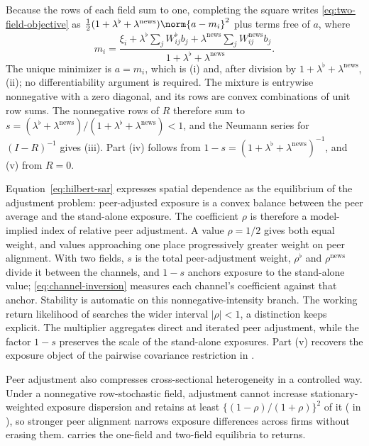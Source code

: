 Because the rows of each field sum to one, completing the square writes
\eqref{eq:two-field-objective} as
$\tfrac12(1+\lambda^\flat+\lambda^{\mathrm{news}})\norm{a-m_i}^2$ plus terms
free of $a$, where
\[
  m_i=\frac{\xi_i+\lambda^\flat\sum_j W^\flat_{ij}b_j
    +\lambda^{\mathrm{news}}\sum_j
  W^{\mathrm{news}}_{ij}b_j}{1+\lambda^\flat+\lambda^{\mathrm{news}}}.
\]
The unique minimizer is $a=m_i$, which is (i) and, after division by
$1+\lambda^\flat+\lambda^{\mathrm{news}}$, (ii); no differentiability
argument is required.
The mixture is entrywise nonnegative with a zero diagonal, and its rows are
convex combinations of unit row sums.
The nonnegative rows of $R$ therefore sum to $s=(\lambda^\flat+\lambda^{\mathrm{news}})/
(1+\lambda^\flat+\lambda^{\mathrm{news}})<1$, and the Neumann series for
$(I-R)^{-1}$ gives (iii).
Part (iv) follows from $1-s=(1+\lambda^\flat+\lambda^{\mathrm{news}})^{-1}$,
and (v) from $R=0$.

Equation~\eqref{eq:hilbert-sar} expresses spatial dependence as the equilibrium
of the adjustment problem: peer-adjusted exposure is a convex balance between
the peer average and the stand-alone exposure.
The coefficient $\rho$ is therefore a model-implied index of relative peer
adjustment.
A value $\rho=1/2$ gives both equal weight, and values approaching one place
progressively greater weight on peer alignment.
With two fields, $s$ is the total peer-adjustment weight, $\rho^\flat$ and
$\rho^{\mathrm{news}}$
divide it between the channels, and $1-s$ anchors exposure to the stand-alone
value; \eqref{eq:channel-inversion} measures each channel's coefficient against
that anchor.
Stability is automatic on this nonnegative-intensity branch.
The working return likelihood of  searches the wider
interval $|\rho|<1$, a distinction  keeps explicit.
The multiplier aggregates direct and iterated peer adjustment, while the factor
$1-s$ preserves the scale of the stand-alone exposures.
Part (v) recovers the exposure object of the pairwise covariance restriction in
\citet{gawronsky_continuous_2026}.

Peer adjustment also compresses cross-sectional heterogeneity in a controlled
way.
Under a nonnegative row-stochastic field, adjustment cannot increase
stationary-weighted exposure dispersion and retains at least
$\{(1-\rho)/(1+\rho)\}^2$ of it ( in
), so stronger peer alignment narrows exposure
differences across firms without erasing them.
 carries the one-field and two-field
equilibria to returns.
